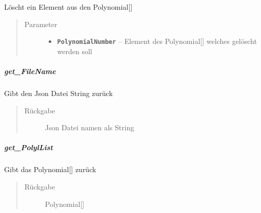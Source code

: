 \documentclass[letterpaper,10pt,ngerman]{sphinxmanual}
\begin{document}
\begin{fulllineitems}
\label{com/linuxluigi/polynomial/PolynomialList:com.linuxluigi.polynomial.PolynomialList.delte(int)}
Löscht ein Element aus den Polynomial{[}{]}
\begin{quote}\begin{description}
\item[{Parameter}] \leavevmode\begin{itemize}
\item {} 
\textbf{\texttt{PolynomialNumber}} -- Element des Polynomial{[}{]} welches gelöscht werden soll

\end{itemize}

\end{description}\end{quote}

\end{fulllineitems}



\subparagraph{get\_FileName}
\label{com/linuxluigi/polynomial/PolynomialList:get-filename}

\begin{fulllineitems}
\label{com/linuxluigi/polynomial/PolynomialList:com.linuxluigi.polynomial.PolynomialList.get_FileName()}
Gibt den Json Datei String zurück
\begin{quote}\begin{description}
\item[{Rückgabe}] \leavevmode
Json Datei namen als String

\end{description}\end{quote}

\end{fulllineitems}



\subparagraph{get\_PolylList}
\label{com/linuxluigi/polynomial/PolynomialList:get-polyllist}

\begin{fulllineitems}
\label{com/linuxluigi/polynomial/PolynomialList:com.linuxluigi.polynomial.PolynomialList.get_PolylList()}
Gibt das Polynomial{[}{]} zurück
\begin{quote}\begin{description}
\item[{Rückgabe}] \leavevmode
Polynomial{[}{]}

\end{description}\end{quote}

\end{fulllineitems}
\end{document}
